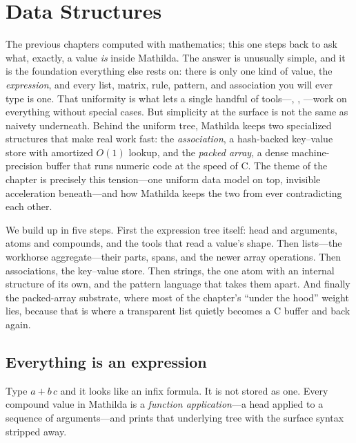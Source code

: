 \chapter{Data Structures}
\label{ch:datastructures}

The previous chapters computed with mathematics; this one steps back to ask what,
exactly, a value \emph{is} inside Mathilda. The answer is unusually simple, and it
is the foundation everything else rests on: there is only one kind of value, the
\emph{expression}, and every list, matrix, rule, pattern, and association you will
ever type is one. That uniformity is what lets a single handful of tools---,
, ---work on everything without special cases. But simplicity at
the surface is not the same as naivety underneath. Behind the uniform tree, Mathilda
keeps two specialized structures that make real work fast: the \emph{association},
a hash-backed key--value store with amortized \(O(1)\) lookup, and the \emph{packed
array}, a dense machine-precision buffer that runs numeric code at the speed of C.
The theme of the chapter is precisely this tension---one uniform data model on top,
invisible acceleration beneath---and how Mathilda keeps the two from ever
contradicting each other.

We build up in five steps. First the expression tree itself: head and arguments,
atoms and compounds, and the tools that read a value's shape. Then lists---the
workhorse aggregate---their parts, spans, and the newer array operations. Then
associations, the key--value store. Then strings, the one atom with an internal
structure of its own, and the pattern language that takes them apart. And finally
the packed-array substrate, where
most of the chapter's ``under the hood'' weight lies, because that is where a
transparent list quietly becomes a C buffer and back again.

\section{Everything is an expression}
\label{sec:ds-expressions}

Type \(a + b\,c\) and it looks like an infix formula. It is not stored as one.
Every compound value in Mathilda is a \emph{function application}---a head applied to a sequence of arguments---and  prints
that underlying tree with the surface syntax stripped away.

\begin{codepairs}
\end{codepairs}

